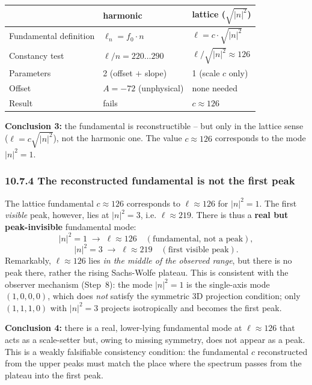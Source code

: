 \begin{center}
\begin{tabular}{p{4.5cm}p{3.5cm}p{3.5cm}}
\toprule
 & \textbf{harmonic} & \textbf{lattice ($\sqrt{|n|^2}$)} \\
\midrule
Fundamental definition & $\ell_n = f_0\cdot n$ & $\ell = c\cdot\sqrt{|n|^2}$ \\
Constancy test & $\ell/n = 220\ldots290$ & $\ell/\sqrt{|n|^2} \approx 126$ \\
Parameters & 2 (offset $+$ slope) & 1 (scale $c$ only) \\
Offset & $A = -72$ (unphysical) & none needed \\
Result & fails & $c \approx 126$ \\
\bottomrule
\end{tabular}
\end{center}

\textbf{Conclusion 3:} the fundamental is reconstructible -- but only
in the lattice sense ($\ell = c\sqrt{|n|^2}$), not the harmonic one.
The value $c \approx 126$ corresponds to the mode $|n|^2 = 1$.

\subsubsection*{10.7.4 The reconstructed fundamental is not the first peak}

The lattice fundamental $c \approx 126$ corresponds to $\ell \approx 126$
for $|n|^2 = 1$. The first \emph{visible} peak, however, lies at
$|n|^2 = 3$, i.e. $\ell \approx 219$. There is thus a \textbf{real but
peak-invisible} fundamental mode:
\[
  |n|^2 = 1 \;\to\; \ell \approx 126
  \quad(\text{fundamental, not a peak}),
\]
\[
  |n|^2 = 3 \;\to\; \ell \approx 219
  \quad(\text{first visible peak}).
\]
Remarkably, $\ell \approx 126$ lies \emph{in the middle of the
observed range}, but there is no peak there, rather the rising
Sachs-Wolfe plateau. This is consistent with the observer mechanism
(Step~8): the mode $|n|^2=1$ is the single-axis mode $(1,0,0,0)$, which
does \emph{not} satisfy the symmetric 3D projection condition; only
$(1,1,1,0)$ with $|n|^2=3$ projects isotropically and becomes the
first peak.

\textbf{Conclusion 4:} there is a real, lower-lying fundamental mode at
$\ell \approx 126$ that acts as a scale-setter but, owing to missing
symmetry, does not appear as a peak. This is a weakly falsifiable
consistency condition: the fundamental $c$ reconstructed from the upper
peaks must match the place where the spectrum passes from the plateau
into the first peak.

